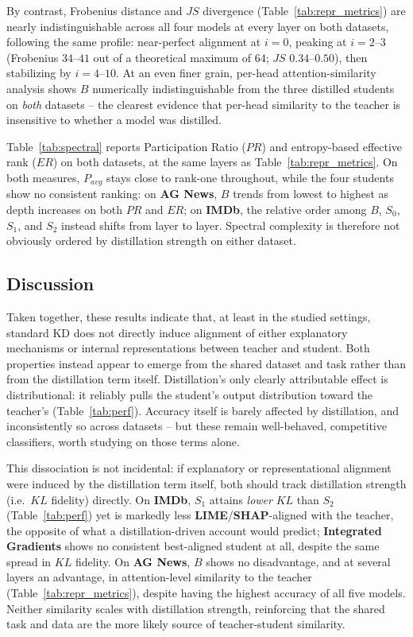 \documentclass[conference]{IEEEtran}
\begin{document}
By contrast, Frobenius distance and $JS$ divergence (Table~\ref{tab:repr_metrics}) are nearly indistinguishable across all four models at every layer on both datasets, following the same profile: near-perfect alignment at $i=0$, peaking at $i=2$--$3$ (Frobenius $34$--$41$ out of a theoretical maximum of $64$; $JS$ $0.34$--$0.50$), then stabilizing by $i=4$--$10$. At an even finer grain, per-head attention-similarity analysis shows $B$ numerically indistinguishable from the three distilled students on \emph{both} datasets -- the clearest evidence that per-head similarity to the teacher is insensitive to whether a model was distilled.

Table~\ref{tab:spectral} reports Participation Ratio ($PR$) and entropy-based effective rank ($ER$) on both datasets, at the same layers as Table~\ref{tab:repr_metrics}. On both measures, $P_{avg}$ stays close to rank-one throughout, while the four students show no consistent ranking: on \textbf{AG News}, $B$ trends from lowest to highest as depth increases on both $PR$ and $ER$; on \textbf{IMDb}, the relative order among $B$, $S_0$, $S_1$, and $S_2$ instead shifts from layer to layer. Spectral complexity is therefore not obviously ordered by distillation strength on either dataset.

\subsection{Discussion}\label{sec:discussion}

Taken together, these results indicate that, at least in the studied settings, standard KD does not directly induce alignment of either explanatory mechanisms or internal representations between teacher and student. Both properties instead appear to emerge from the shared dataset and task rather than from the distillation term itself. Distillation's only clearly attributable effect is distributional: it reliably pulls the student's output distribution toward the teacher's (Table~\ref{tab:perf}). Accuracy itself is barely affected by distillation, and inconsistently so across datasets -- but these remain well-behaved, competitive classifiers, worth studying on those terms alone.

This dissociation is not incidental: if explanatory or representational alignment were induced by the distillation term itself, both should track distillation strength (i.e.\ $KL$ fidelity) directly. On \textbf{IMDb}, $S_1$ attains \emph{lower} $KL$ than $S_2$ (Table~\ref{tab:perf}) yet is markedly less \textbf{LIME}/\textbf{SHAP}-aligned with the teacher, the opposite of what a distillation-driven account would predict; \textbf{Integrated Gradients} shows no consistent best-aligned student at all, despite the same spread in $KL$ fidelity. On \textbf{AG News}, $B$ shows no disadvantage, and at several layers an advantage, in attention-level similarity to the teacher (Table~\ref{tab:repr_metrics}), despite having the highest accuracy of all five models. Neither similarity scales with distillation strength, reinforcing that the shared task and data are the more likely source of teacher-student similarity.
\end{document}
